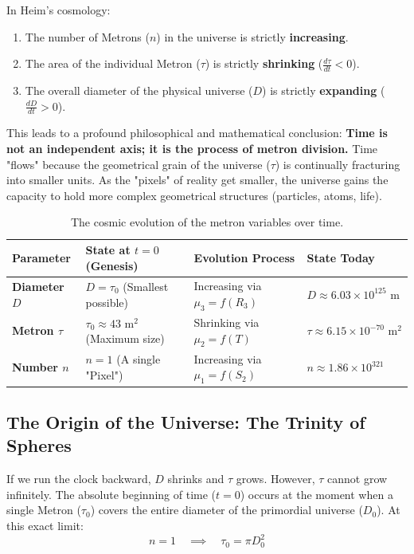 \documentclass[11pt,a4paper,oneside]{article}
\begin{document}
In Heim's cosmology:
\begin{enumerate}
    \item The number of Metrons ($n$) in the universe is strictly \textbf{increasing}.
    \item The area of the individual Metron ($\tau$) is strictly \textbf{shrinking} ($\frac{d\tau}{dt} < 0$).
    \item The overall diameter of the physical universe ($D$) is strictly \textbf{expanding} ($\frac{dD}{dt} > 0$).
\end{enumerate}

This leads to a profound philosophical and mathematical conclusion: \textbf{Time is not an independent axis; it is the process of metron division.} Time "flows" because the geometrical grain of the universe ($\tau$) is continually fracturing into smaller units. As the "pixels" of reality get smaller, the universe gains the capacity to hold more complex geometrical structures (particles, atoms, life).

\begin{table}[htbp]
\centering
\renewcommand{\arraystretch}{1.4}
\begin{tabular}{llll}
\toprule
\textbf{Parameter} & \textbf{State at $t=0$ (Genesis)} & \textbf{Evolution Process} & \textbf{State Today} \\
\midrule
\rowcolor{gray!10}
\textbf{Diameter $D$} & $D = \tau_0$ (Smallest possible) & Increasing via $\mu_3 = f(R_3)$ & $D \approx 6.03 \times 10^{125}$ m \\
\textbf{Metron $\tau$} & $\tau_0 \approx 43 \text{ m}^2$ (Maximum size) & Shrinking via $\mu_2 = f(T)$ & $\tau \approx 6.15 \times 10^{-70} \text{ m}^2$ \\
\rowcolor{gray!10}
\textbf{Number $n$} & $n = 1$ (A single "Pixel") & Increasing via $\mu_1 = f(S_2)$ & $n \approx 1.86 \times 10^{321}$ \\
\bottomrule
\end{tabular}
\caption{The cosmic evolution of the metron variables over time.}
\end{table}

\subsection{The Origin of the Universe: The Trinity of Spheres}
If we run the clock backward, $D$ shrinks and $\tau$ grows. However, $\tau$ cannot grow infinitely. The absolute beginning of time ($t=0$) occurs at the moment when a single Metron ($\tau_0$) covers the entire diameter of the primordial universe ($D_0$). At this exact limit:
\begin{equation}
    n = 1 \quad \implies \quad \tau_0 = \pi D_0^2
\end{equation}
\end{document}

